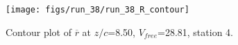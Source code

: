 \begin{figure}[H]
\centering
\texttt{[image: figs/run\_38/run\_38\_R\_contour]}
\caption{Contour plot of $\overline{r}$ at $z/c$=8.50, $V_{free}$=28.81, station 4.}
\label{fig:run_38_R_contour}
\end{figure}


